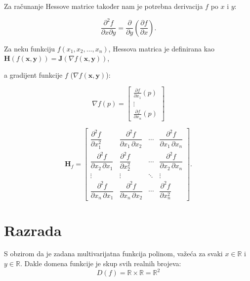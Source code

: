 \documentclass[12pt,a4paper]{report}
\begin{document}
Za računanje Hessove matrice također nam je potrebna derivacija $f$ po $x$ i $y$:

\begin{equation}
    \frac{\partial^2 f}{\partial x \partial y} = \frac{\partial}{\partial y} (\frac{\partial f}{\partial x}).
\end{equation}


Za neku funkciju $f(x_1, x_2, \dots, x_n)$, Hessova matrica je definirana kao\\

$\mathbf{H}(f(\mathbf{x, y})) = \mathbf{J}(\nabla f(\mathbf{x, y}))$,

a gradijent funkcije $f$ ($\nabla f(\mathbf{x, y})$):

\begin{equation}
    \nabla f(p) = \begin{bmatrix}
        \frac{\partial f}{\partial x_1}(p) \\
        \vdots \\
        \frac{\partial f}{\partial x_n}(p)
       \end{bmatrix}
\end{equation}

\begin{equation}
    \mathbf H_f= \begin{bmatrix}
        \dfrac{\partial^2 f}{\partial x_1^2} & \dfrac{\partial^2 f}{\partial x_1\,\partial x_2} & \cdots & \dfrac{\partial^2 f}{\partial x_1\,\partial x_n} \\[2.2ex]
        \dfrac{\partial^2 f}{\partial x_2\,\partial x_1} & \dfrac{\partial^2 f}{\partial x_2^2} & \cdots & \dfrac{\partial^2 f}{\partial x_2\,\partial x_n} \\[2.2ex]
        \vdots & \vdots & \ddots & \vdots \\[2.2ex]
        \dfrac{\partial^2 f}{\partial x_n\,\partial x_1} & \dfrac{\partial^2 f}{\partial x_n\,\partial x_2} & \cdots & \dfrac{\partial^2 f}{\partial x_n^2}
    \end{bmatrix}.
\end{equation}

\chapter{Razrada}

S obzirom da je zadana multivarijatna funkcija polinom, važeća za svaki $x \in \mathbb{R}$ i $y \in \mathbb{R}$.
Dakle domena funkcije je skup svih realnih brojeva:
$$
    D(f) = \mathbb{R} \times \mathbb{R} = \mathbb{R}^2
$$
\end{document}
